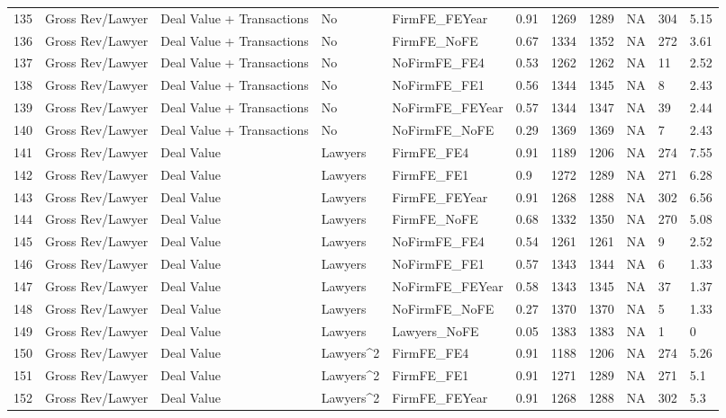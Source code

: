\documentclass{article}
\begin{document}
\begin{table}[H]
\begin{tabular}{rllllllllll}
  135 & Gross Rev/Lawyer & Deal Value + Transactions & No & FirmFE\_FEYear & 0.91 & 1269 & 1289 & NA & 304 & 5.15 \\ 
  136 & Gross Rev/Lawyer & Deal Value + Transactions & No & FirmFE\_NoFE & 0.67 & 1334 & 1352 & NA & 272 & 3.61 \\ 
  137 & Gross Rev/Lawyer & Deal Value + Transactions & No & NoFirmFE\_FE4 & 0.53 & 1262 & 1262 & NA & 11 & 2.52 \\ 
  138 & Gross Rev/Lawyer & Deal Value + Transactions & No & NoFirmFE\_FE1 & 0.56 & 1344 & 1345 & NA & 8 & 2.43 \\ 
  139 & Gross Rev/Lawyer & Deal Value + Transactions & No & NoFirmFE\_FEYear & 0.57 & 1344 & 1347 & NA & 39 & 2.44 \\ 
  140 & Gross Rev/Lawyer & Deal Value + Transactions & No & NoFirmFE\_NoFE & 0.29 & 1369 & 1369 & NA & 7 & 2.43 \\ 
  141 & Gross Rev/Lawyer & Deal Value & Lawyers & FirmFE\_FE4 & 0.91 & 1189 & 1206 & NA & 274 & 7.55 \\ 
  142 & Gross Rev/Lawyer & Deal Value & Lawyers & FirmFE\_FE1 & 0.9 & 1272 & 1289 & NA & 271 & 6.28 \\ 
  143 & Gross Rev/Lawyer & Deal Value & Lawyers & FirmFE\_FEYear & 0.91 & 1268 & 1288 & NA & 302 & 6.56 \\ 
  144 & Gross Rev/Lawyer & Deal Value & Lawyers & FirmFE\_NoFE & 0.68 & 1332 & 1350 & NA & 270 & 5.08 \\ 
  145 & Gross Rev/Lawyer & Deal Value & Lawyers & NoFirmFE\_FE4 & 0.54 & 1261 & 1261 & NA & 9 & 2.52 \\ 
  146 & Gross Rev/Lawyer & Deal Value & Lawyers & NoFirmFE\_FE1 & 0.57 & 1343 & 1344 & NA & 6 & 1.33 \\ 
  147 & Gross Rev/Lawyer & Deal Value & Lawyers & NoFirmFE\_FEYear & 0.58 & 1343 & 1345 & NA & 37 & 1.37 \\ 
  148 & Gross Rev/Lawyer & Deal Value & Lawyers & NoFirmFE\_NoFE & 0.27 & 1370 & 1370 & NA & 5 & 1.33 \\ 
  149 & Gross Rev/Lawyer & Deal Value & Lawyers & Lawyers\_NoFE & 0.05 & 1383 & 1383 & NA & 1 & 0 \\ 
  150 & Gross Rev/Lawyer & Deal Value & Lawyers^2 & FirmFE\_FE4 & 0.91 & 1188 & 1206 & NA & 274 & 5.26 \\ 
  151 & Gross Rev/Lawyer & Deal Value & Lawyers^2 & FirmFE\_FE1 & 0.91 & 1271 & 1289 & NA & 271 & 5.1 \\ 
  152 & Gross Rev/Lawyer & Deal Value & Lawyers^2 & FirmFE\_FEYear & 0.91 & 1268 & 1288 & NA & 302 & 5.3 \\ 

\end{tabular}
\end{table}
\end{document}
